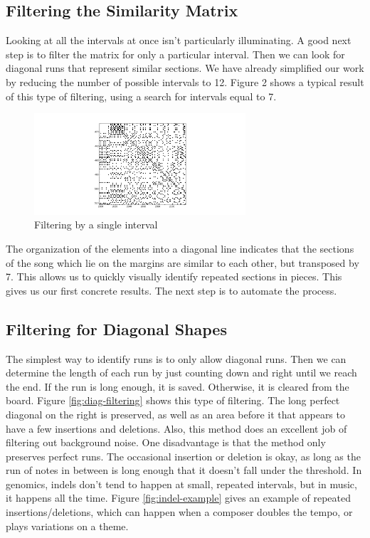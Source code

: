 \documentclass{article}
\begin{document}
\subsection{Filtering the Similarity Matrix}
Looking at all the intervals at once isn't particularly illuminating. A good next step is to filter the matrix for only a particular interval. Then we can look for diagonal runs that represent similar sections. We have already simplified our work by reducing the number of possible intervals to 12. Figure 2 shows a typical result of this type of filtering, using a search for intervals equal to 7.

\begin{figure}[h]
\begin{center}\includegraphics[width=0.7\textwidth]{figure_4.png}
\end{center}\caption{Filtering by a single interval} \label{fig:single-interval}
\end{figure}

The organization of the elements into a diagonal line indicates that the sections of the song which lie on the margins are similar to each other, but transposed by 7. This allows us to quickly visually identify repeated sections in pieces. This gives us our first concrete results. The next step is to automate the process.

\subsection{Filtering for Diagonal Shapes}
The simplest way to identify runs is to only allow diagonal runs. Then we can determine the length of each run by just counting down and right until we reach the end. If the run is long enough, it is saved. Otherwise, it is cleared from the board. Figure \ref{fig:diag-filtering} shows this type of filtering. The long perfect diagonal on the right is preserved, as well as an area before it that appears to have a few insertions and deletions. Also, this method does an excellent job of filtering out background noise. One disadvantage is that the method only preserves perfect runs. The occasional insertion or deletion is okay, as long as the run of notes in between is long enough that it doesn't fall under the threshold. In genomics, indels don't tend to happen at small, repeated intervals, but in music, it happens all the time. Figure \ref{fig:indel-example} gives an example of repeated insertions/deletions, which can happen when a composer doubles the tempo, or plays variations on a theme. 
\end{document}
